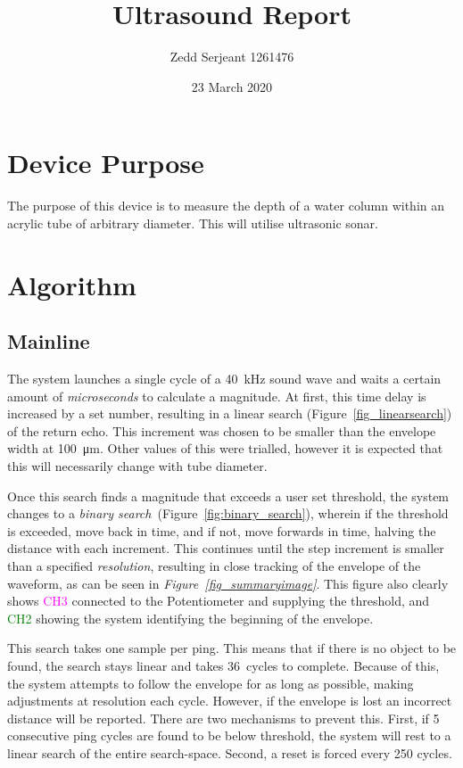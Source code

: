 \documentclass[a4paper]{article}
\title{Ultrasound Report}
\author{Zedd Serjeant 1261476}
\date{23 March 2020}
\begin{document}
\maketitle

\section{Device Purpose}
The purpose of this device is to measure the depth of a water column within an acrylic tube of arbitrary diameter. This will utilise ultrasonic sonar.

\section{Algorithm}
\subsection{Mainline}
The system launches a single cycle of a \SI{40}{\kilo\hertz} sound wave and waits a certain amount of \textit{microseconds} to calculate a magnitude. At first, this time delay is increased by a set number, resulting in a linear search (Figure~\ref{fig_linearsearch}) of the return echo. This increment was chosen to be smaller than the envelope width at \SI{100}{\micro\meter}. Other values of this were trialled, however it is expected that this will necessarily change with tube diameter. 

Once this search finds a magnitude that exceeds a user set threshold, the system changes to a \textit{binary search}~(Figure~\ref{fig:binary_search}), wherein if the threshold is exceeded, move back in time, and if not, move forwards in time, halving the distance with each increment. This continues until the step increment is smaller than a specified \textit{resolution}, resulting in close tracking of the envelope of the waveform, as can be seen in \textit{Figure~\ref{fig_summaryimage}}. This figure also clearly shows \textcolor{magenta}{CH3} connected to the Potentiometer and supplying the threshold, and \textcolor{green}{CH2} showing the system identifying the beginning of the envelope.

This search takes one sample per ping. This means that if there is no object to be found, the search stays linear and takes 36~cycles to complete. Because of this, the system attempts to follow the envelope for as long as possible, making adjustments at resolution each cycle. However, if the envelope is lost an incorrect distance will be reported. There are two mechanisms to prevent this. First, if 5 consecutive ping cycles are found to be below threshold, the system will rest to a linear search of the entire search-space. Second, a reset is forced every 250 cycles.
\end{document}
